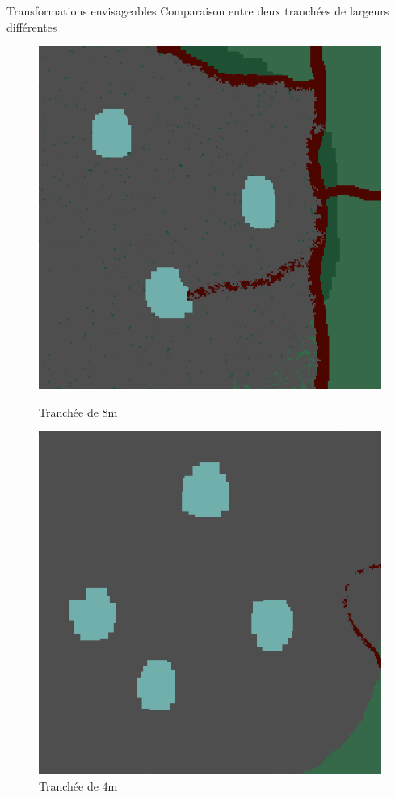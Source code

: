 \documentclass{beamer}
\begin{document}
\begin{frame}{Transformations envisageables \hyperlink{jump}{\beamerbutton{ }} \hypertarget{16}{\beamerbutton{ }}}
    Comparaison entre deux tranchées de largeurs différentes
    
    \begin{figure}[!htb]
        \begin{minipage}{0.48\textwidth}
          \centering
          \includegraphics[width=.8\linewidth]{pictures/trans/treach.png}
          \caption{Tranchée de $8$m}\label{Fig:Data1}
        \end{minipage}\hfill
        \begin{minipage}{0.48\textwidth}
          \centering
          \includegraphics[width=.8\linewidth]{pictures/trans/little_treach.png}
          \caption{Tranchée de $4$m}\label{Fig:Data2}
        \end{minipage}
     \end{figure}
\end{frame}
\end{document}
